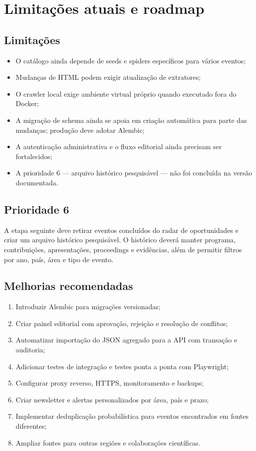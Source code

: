 \chapter{Limitações atuais e roadmap}

\section{Limitações}

\begin{itemize}[leftmargin=*,itemsep=0.25em]
\item O catálogo ainda depende de seeds e spiders específicos para vários eventos;
\item Mudanças de HTML podem exigir atualização de extratores;
\item O crawler local exige ambiente virtual próprio quando executado fora do Docker;
\item A migração de schema ainda se apoia em criação automática para parte das mudanças; produção deve adotar Alembic;
\item A autenticação administrativa e o fluxo editorial ainda precisam ser fortalecidos;
\item A prioridade 6 — arquivo histórico pesquisável — não foi concluída na versão documentada.
\end{itemize}

\section{Prioridade 6}

A etapa seguinte deve retirar eventos concluídos do radar de oportunidades e criar um arquivo histórico pesquisável. O histórico deverá manter programa, contribuições, apresentações, proceedings e evidências, além de permitir filtros por ano, país, área e tipo de evento.

\section{Melhorias recomendadas}

\begin{enumerate}[leftmargin=*,itemsep=0.25em]
\item Introduzir Alembic para migrações versionadas;
\item Criar painel editorial com aprovação, rejeição e resolução de conflitos;
\item Automatizar importação do JSON agregado para a API com transação e auditoria;
\item Adicionar testes de integração e testes ponta a ponta com Playwright;
\item Configurar proxy reverso, HTTPS, monitoramento e backups;
\item Criar newsletter e alertas personalizados por área, país e prazo;
\item Implementar deduplicação probabilística para eventos encontrados em fontes diferentes;
\item Ampliar fontes para outras regiões e colaborações científicas.
\end{enumerate}
